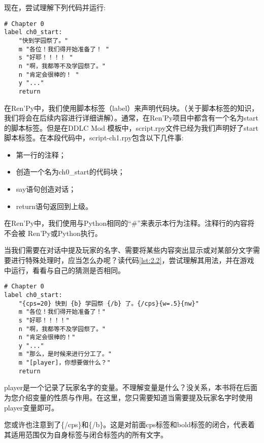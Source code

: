 现在，尝试理解下列代码并运行:

\begin{lstlisting}[caption=scipt-ch1.rpy, label={lst:2.1}]
# Chapter 0
label ch0_start:
    "快到学园祭了。"
    m "各位！我们得开始准备了！ "
    s "好耶！！！！ "
    n "啊，我都等不及学园祭了。"
    n "肯定会很棒的！ "
    y "..."
    return
\end{lstlisting}

在Ren'Py中，我们使用脚本标签（label）来声明代码块。（关于脚本标签的知识，我们将会在后续内容进行详细讲解）。通常，在Ren'Py项目中都含有一个名为start的脚本标签。但是在DDLC Mod 模板中，script.rpy文件已经为我们声明好了start脚本标签。在本段代码中，script-ch1.rpy包含以下几件事:

\begin{itemize}
    \item 第一行的注释；
    \item 创造一个名为ch0\_start的代码块；
    \item say语句创造对话；
    \item return语句返回到上级。
\end{itemize}

\begin{Comment}
在Ren'Py中，我们使用与Python相同的“\#”来表示本行为注释。注释行的内容将不会被 Ren'Py或Python执行。
\end{Comment}

当我们需要在对话中提及玩家的名字、需要将某些内容突出显示或对某部分文字需要进行特殊处理时，应当怎么办呢？读代码\ref{lst:2.2}，尝试理解其用法，并在游戏中运行，看看与自己的猜测是否相同。

\begin{lstlisting}[caption=scipt-ch1.rpy, label={lst:2.2}]
# Chapter 0
label ch0_start:
    "{cps=20} 快到 {b} 学园祭 {/b} 了。{/cps}{w=.5}{nw}"
    m "各位！我们得开始准备了！"
    s "好耶！！！！"
    n "啊，我都等不及学园祭了。"
    n "肯定会很棒的！"
    y "..."
    m "那么，是时候来进行分工了。"
    m "[player]，你想要做什么？"
    return
\end{lstlisting}

\begin{ExtraKnowledge}
player是一个记录了玩家名字的变量。不理解变量是什么？没关系，本书将在后面为您介绍变量的性质与作用。在这里，您只需要知道当需要提及玩家名字时使用player变量即可。
\end{ExtraKnowledge}

\begin{ExtraKnowledge}
您或许也注意到了\{/cps\}和\{/b\}。这是对前面cps标签和bold标签的闭合，代表着其适用范围仅为自身标签与闭合标签内的所有文字。
\end{ExtraKnowledge}

